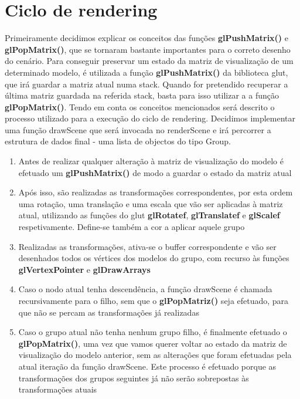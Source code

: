 \documentclass[12pt]{article}
\begin{document}
\section{Ciclo de rendering}
Primeiramente decidimos explicar os conceitos das funções 
\textbf{glPushMatrix()} e \textbf{glPopMatrix()}, que se tornaram bastante importantes para o correto desenho do cenário.
Para conseguir preservar um estado da matriz de visualização de um
determinado modelo, é utilizada a função \textbf{glPushMatrix()} da biblioteca glut, que irá
guardar a matriz atual numa stack.
Quando for pretendido recuperar a última matriz guardada na referida stack, basta para isso utilizar a
a função \textbf{glPopMatrix()}.\newline
Tendo em conta os conceitos mencionados será descrito o processo utilizado para a
execução do ciclo de rendering.
Decidimos implementar uma função drawScene que será invocada no renderScene 
e irá percorrer a estrutura de dados final - uma lista de objectos
do tipo Group.
\begin{enumerate}
\item Antes de realizar qualquer alteração à matriz de visualização do modelo é
efetuado um \textbf{glPushMatrix()} de modo a guardar o estado da matriz atual
\item Após isso, são realizadas as transformações correspondentes, por esta ordem
uma rotação, uma translação e uma escala que vão ser
aplicadas à matriz atual, utilizando as funções do glut \textbf{glRotatef}, \textbf{glTranslatef} e \textbf{glScalef} respetivamente. 
Define-se também a cor a aplicar aquele grupo
\item Realizadas as transformações, ativa-se o buffer correspondente e 
vão ser desenhados todos os vértices dos modelos do grupo, com recurso às funções
\textbf{glVertexPointer} e \textbf{glDrawArrays}
\item Caso o nodo atual tenha
descendência, a função drawScene é chamada recursivamente para o filho,
sem que o \textbf{glPopMatriz()} seja efetuado, para que não se percam as
transformações já realizadas
\item Caso o grupo atual não tenha nenhum grupo filho, é finalmente efetuado o \textbf{glPopMatrix()},
uma vez que vamos querer voltar ao estado da matriz de visualização do modelo
anterior, sem as alterações que foram efetuadas pela atual iteração da função
drawScene. Este processo é efetuado porque as transformações dos grupos
seguintes já não serão sobrepostas às transformações atuais
\end{enumerate}
\newpage
\end{document}
